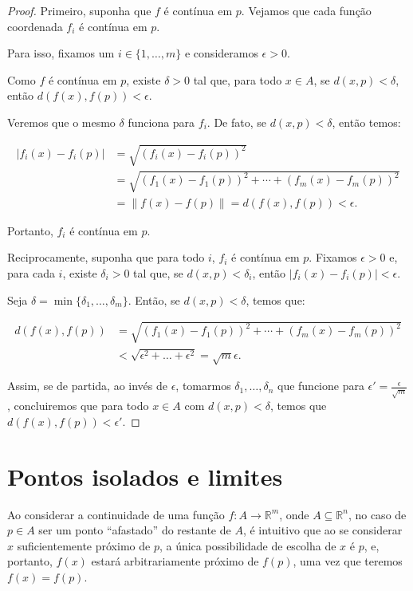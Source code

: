 \begin{proof}
    Primeiro, suponha que $f$ é contínua em $p$.
    Vejamos que cada função coordenada $f_i$ é contínua em $p$.
    
    Para isso, fixamos um $i \in \{1, \dots, m\}$ e consideramos $\epsilon>0$.

    Como $f$ é contínua em $p$, existe $\delta>0$ tal que, para todo $x \in A$, se $d(x, p) < \delta$, então $d(f(x), f(p)) < \epsilon$.

    Veremos que o mesmo $\delta$ funciona para $f_i$.
    De fato, se $d(x, p) < \delta$, então temos:

    \begin{align*}
        |f_i(x) - f_i(p)| &= \sqrt{(f_i(x) - f_i(p))^2} \\
        &= \sqrt{(f_1(x) - f_1(p))^2 + \cdots + (f_m(x) - f_m(p))^2} \\
        &= \|f(x) - f(p)\| = d(f(x), f(p)) < \epsilon.
    \end{align*}

    Portanto, $f_i$ é contínua em $p$.

    Reciprocamente, suponha que para todo $i$, $f_i$ é contínua em $p$.
    Fixamos $\epsilon>0$ e, para cada $i$, existe $\delta_i>0$ tal que, se $d(x, p) < \delta_i$, então $|f_i(x) - f_i(p)| < \epsilon$.

    Seja $\delta = \min\{\delta_1, \ldots, \delta_m\}$. Então, se $d(x, p) < \delta$, temos que:

    \begin{align*}
        d(f(x), f(p)) &= \sqrt{(f_1(x) - f_1(p))^2 + \cdots + (f_m(x) - f_m(p))^2} \\
        &< \sqrt{\epsilon^2+\dots+\epsilon^2}= \sqrt{m}\epsilon.
    \end{align*}

    Assim, se de partida, ao invés de $\epsilon$, tomarmos $\delta_1, \dots, \delta_n$ que funcione para $\epsilon'=\frac{\epsilon}{\sqrt{m}}$, concluiremos que para todo $x \in A$ com $d(x, p) < \delta$, temos que $d(f(x), f(p)) < \epsilon'$.
\end{proof}

\section{Pontos isolados e limites}
    Ao considerar a continuidade de uma função $f: A \to \mathbb R^m$, onde $A\subseteq \mathbb R^n$, no caso de $p \in A$ ser um ponto ``afastado'' do restante de $A$, é intuitivo que ao se considerar $x$ suficientemente próximo de $p$, a única possibilidade de escolha de $x$ é $p$, e, portanto, $f(x)$ estará arbitrariamente próximo de $f(p)$, uma vez que teremos $f(x)=f(p)$.

